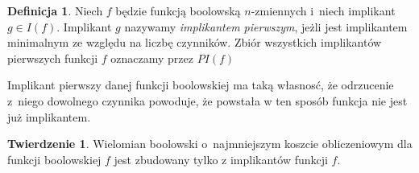 \documentclass[a4paper,11pt,twoside]{article}
\theoremstyle{definition}
\newtheorem{df}{Definicja}
\newtheorem{tw}{Twierdzenie}
\begin{document}
\begin{df}
Niech $f$ będzie funkcją boolowską $n$-zmiennych i~niech implikant $g \in I(f)$.  Implikant $g$ nazywamy {\em implikantem pierwszym}, jeżli jest implikantem minimalnym ze względu na liczbę czynników. Zbiór wszystkich implikantów pierwszych funkcji $f$ oznaczamy przez $\mathit{PI}(f)$
\end{df}

Implikant pierwszy danej funkcji boolowskiej ma taką własnosć, że odrzucenie z~niego dowolnego czynnika powoduje, że powstała  w ten sposób funkcja nie jest już implikantem.

\begin{tw}
Wielomian boolowski o~najmniejszym koszcie obliczeniowym dla funkcji boolowskiej $f$ jest zbudowany tylko z implikantów funkcji $f$.
\end{tw}
\end{document}
